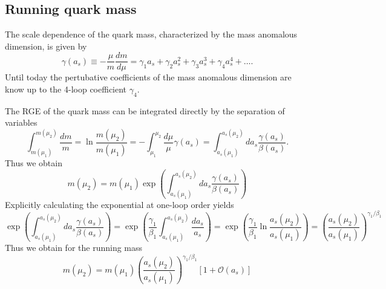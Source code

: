 \subsection*{Running quark mass}
The scale dependence of the quark mass, characterized by the mass anomalous dimension, is given by
\begin{equation}
	\gamma(a_s) \equiv -\frac{\mu}{m}\frac{dm}{d\mu} = \gamma_1 a_s + \gamma_2 a^2_s + \gamma_3 a^3_s + \gamma_4 a^4_s + \ldots.
\end{equation}
Until today the pertubative coefficients of the mass anomalous dimension are know up to the 4-loop coefficient $\gamma_4$. 
\par
The RGE of the quark mass can be integrated directly by the separation of variables
\begin{equation}
	\int^{m(\mu_2)}_{m(\mu_1)} \frac{dm}{m} = \ln \frac{m(\mu_2)}{m(\mu_1)} = - \int^{\mu_2}_{\mu_1} \frac{d\mu}{\mu} \gamma(a_s) = \int^{a_s(\mu_2)}_{a_s(\mu_1)} da_s \frac{\gamma(a_s)}{\beta(a_s)}.
\end{equation}
Thus we obtain 
\begin{equation}
	m(\mu_2) = m(\mu_1) \exp \left(\int^{a_s(\mu_2)}_{a_s(\mu_1)} da_s \frac{\gamma(a_s)}{\beta(a_s)} \right)
\end{equation}
Explicitly calculating the exponential at one-loop order yields
\begin{equation}
	\exp \left( \int^{a_s(\mu_2)}_{a_s(\mu_1)} da_s \frac{\gamma(a_s)}{\beta(a_s)} \right) = \exp \left(\frac{\gamma_1}{\beta_1} \int^{a_s(\mu_2)}_{a_s(\mu_1)} \frac{da_s}{a_s}\right) = \exp \left(\frac{\gamma_1}{\beta_1}\ln \frac{a_s(\mu_2)}{a_s(\mu_1)}\right) = \left(\frac{a_s(\mu_2)}{a_s(\mu_1)}\right)^{\gamma_1/\beta_1}
\end{equation}
Thus we obtain for the running mass
\begin{equation}
	m(\mu_2) = m(\mu_1) \left(\frac{a_s(\mu_2)}{a_s(\mu_1)}\right)^{\gamma_1/\beta_1} [1 + \mathcal{O}(a_s)]
\end{equation}


